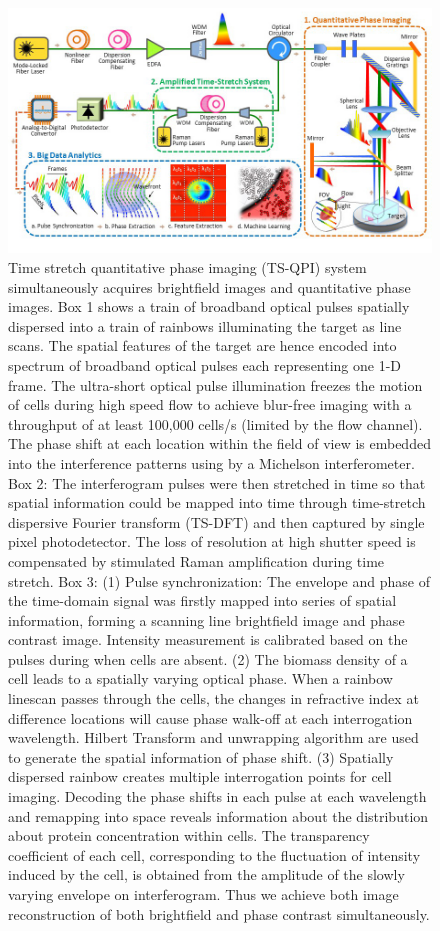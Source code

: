 \documentclass[aps,pra,reprint,superscriptaddress]{revtex4-1}
\begin{document}
\begin{figure}
\includegraphics[scale=0.55]{FigureSetup.jpg}
\caption{\label{fig:Setup} Time stretch quantitative phase imaging (TS-QPI) system simultaneously acquires brightfield images and quantitative phase images. Box 1 shows a train of broadband optical pulses spatially dispersed into a train of rainbows illuminating the target as line scans. The spatial features of the target are hence encoded into spectrum of broadband optical pulses each representing one 1-D frame. The ultra-short optical pulse illumination freezes the motion of cells during high speed flow to achieve blur-free imaging with a throughput of at least 100,000 cells/s (limited by the flow channel). The phase shift at each location within the field of view is embedded into the interference patterns using by a Michelson interferometer. Box 2: The interferogram pulses were then stretched in time so that spatial information could be mapped into time through time-stretch dispersive Fourier transform (TS-DFT) and then captured by single pixel photodetector. The loss of resolution at high shutter speed is compensated by stimulated Raman amplification during time stretch. Box 3: (1) Pulse synchronization: The envelope and phase of the time-domain signal was firstly mapped into series of spatial information, forming a scanning line brightfield image and phase contrast image. Intensity measurement is calibrated based on the pulses during when cells are absent. (2) The biomass density of a cell leads to a spatially varying optical phase. When a rainbow linescan passes through the cells, the changes in refractive index at difference locations will cause phase walk-off at each interrogation wavelength. Hilbert Transform and unwrapping algorithm are used to generate the spatial information of phase shift. (3) Spatially dispersed rainbow creates multiple interrogation points for cell imaging. Decoding the phase shifts in each pulse at each wavelength and remapping into space reveals information about the distribution about protein concentration within cells. The transparency coefficient of each cell, corresponding to the fluctuation of intensity induced by the cell, is obtained from the amplitude of the slowly varying envelope on interferogram. Thus we achieve both image reconstruction of both brightfield and phase contrast simultaneously. }
\end{figure}
\end{document}
